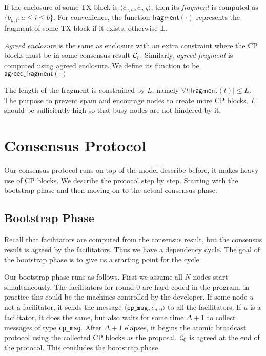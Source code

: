 If the enclosure of some TX block is $\langle c_{u,a}, c_{u, b} \rangle$,
then its \emph{fragment} is computed as $\{ b_{u, i} : a \le i \le b \}$.
For convenience, the function $\textsf{fragment}(\cdot)$ represents the fragment of some TX block if it exists, otherwise $\bot$.

\emph{Agreed enclosure} is the same as enclosure with an extra constraint where the CP blocks must be in some consensus result $\mathcal{C}_r$.
Similarly, \emph{agreed fragment} is computed using agreed enclosure.
We define its function to be $\textsf{agreed\_fragment}(\cdot)$

The length of the fragment is constrained by $L$,
namely $\forall t |\textsf{fragment}(t)| \le L$.
The purpose to prevent spam and encourage nodes to create more CP blocks.
$L$ should be sufficiently high so that busy nodes are not hindered by it.

\section{Consensus Protocol}
\label{sec:cons-protocol}

Our consensus protocol runs on top of the model describe before, it makes heavy use of CP blocks.
We describe the protocol step by step.
Starting with the bootstrap phase and then moving on to the actual consensus phase.

\subsection{Bootstrap Phase}
Recall that facilitators are computed from the consensus result,
but the consensus result is agreed by the facilitators.
Thus we have a dependency cycle.
The goal of the bootstrap phase is to give us a starting point for the cycle.

Our bootstrap phase runs as follows.
First we assume all $N$ nodes start simultaneously.
The facilitators for round 0 are hard coded in the program,
in practice this could be the machines controlled by the developer.
If some node $u$ not a facilitator,
it sends the message $\langle \texttt{cp\_msg}, c_{u, 0} \rangle$ to all the facilitators.
If $u$ is a facilitator, it does the same, but also waits for some time $\Delta + 1$ to collect messages of type \texttt{cp\_msg}.
After $\Delta + 1$ elapses, it begins the atomic broadcast protocol using the collected CP blocks as the proposal.
$\mathcal{C}_0$ is agreed at the end of the protocol.
This concludes the bootstrap phase.

